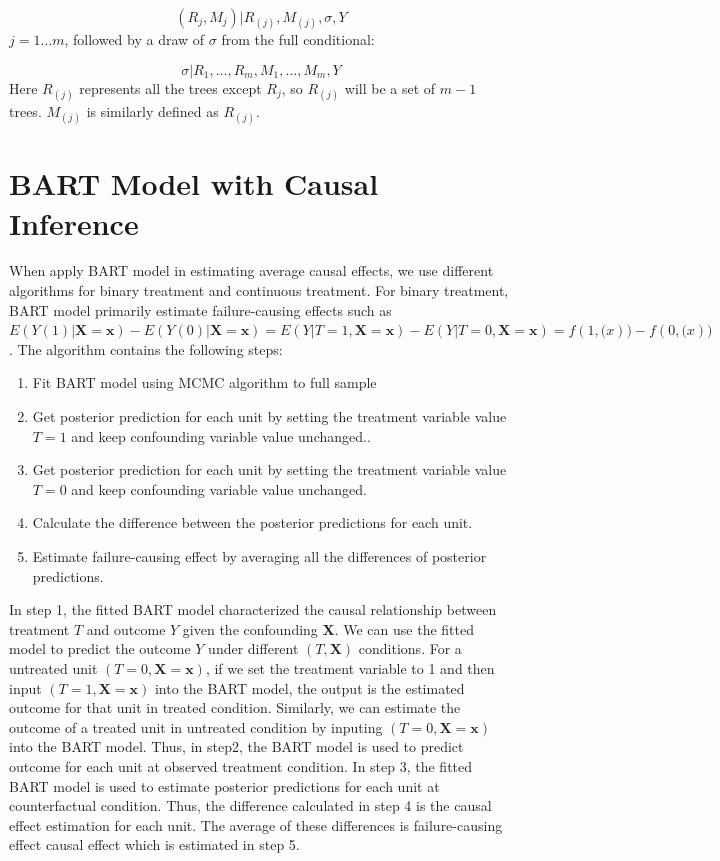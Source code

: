 \begin{equation*}
(R_j,M_j)|R_{(j)}, M_{(j)}, \sigma, Y
\end{equation*}
$j=1 \ldots m$, followed by a draw of $\sigma$ from the full conditional:

\begin{equation*}
\sigma |{R_1}, \ldots ,{R_m},{M_1}, \ldots ,{M_m},Y
\end{equation*}
Here $R_{(j)}$ represents all the trees except $R_j$, so $R_{(j)}$ will be a set of $m-1$ trees. $M_{(j)}$ is similarly defined as $R_{(j)}$.

\section{BART Model with Causal Inference}\label{BARTafce}%

When apply BART model in estimating average causal effects, we use different algorithms for binary treatment and continuous treatment. For binary treatment, BART model primarily estimate failure-causing effects such as $E(Y(1)|\pmb{X}=\pmb{x}) - E(Y(0)|\pmb{X}=\pmb{x})=E(Y|T=1, \pmb{X}=\pmb{x})-E(Y|T=0, \pmb{X}=\pmb{x})=f(1,\pmb(x))-f(0,\pmb(x))$ . The algorithm contains the following steps:
\begin{enumerate}
\item Fit BART model using MCMC algorithm to full sample
\item Get posterior prediction for each unit by setting the treatment variable value $T=1$ and keep confounding variable value unchanged..
\item Get posterior prediction for each unit by setting the treatment variable value $T=0$ and keep confounding variable value unchanged.
\item	Calculate the difference between the posterior predictions for each unit.
\item Estimate failure-causing effect by averaging all the differences of posterior predictions.
\end{enumerate}

In step 1, the fitted BART model characterized the causal relationship between treatment $T$ and outcome $Y$ given the confounding $\pmb{X}$. We can use the fitted model to predict the outcome $Y$ under different $(T, \pmb{X})$ conditions. For a untreated unit $(T=0, \pmb{X}=\pmb{x})$,  if we set the treatment variable to 1 and then input $(T=1, \pmb{X}=\pmb{x})$ into the BART model, the output is the estimated outcome for that unit in treated condition. Similarly, we can estimate the outcome of a treated unit in untreated condition by inputing $(T=0, \pmb{X}=\pmb{x})$ into the BART model. Thus, in step2, the BART model is used to predict outcome for each unit at observed treatment condition. In step 3, the fitted BART model is used to estimate posterior predictions for each unit at counterfactual condition. Thus, the difference calculated in step 4 is the causal effect estimation for each unit. The average of these differences is failure-causing effect causal effect which is estimated in step 5.


